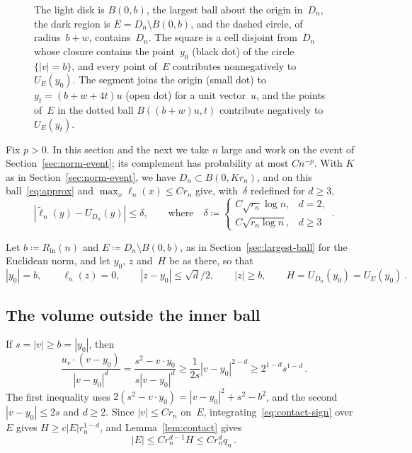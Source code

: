 \documentclass[11pt]{amsart}
\theoremstyle{plain}
\theoremstyle{definition}
\newcommand{\Rin}{R_{\mathrm{in}}}
\numberwithin{equation}{section}
\begin{document}
\begin{figure}[b]
\caption{The light disk is $B(0,b)$, the largest ball about the origin in~$D_n$, the dark region is $E=D_n\setminus B(0,b)$, and the dashed circle, of radius~$b+w$, contains~$D_n$. The square is a cell disjoint from~$D_n$ whose closure contains the point~$y_0$ (black dot) of the circle $\{|v|=b\}$, and every point of~$E$ contributes nonnegatively to~$U_E(y_0)$. The segment joins the origin (small dot) to $y_t=(b+w+4t)u$ (open dot) for a unit vector~$u$, and the points of~$E$ in the dotted ball $B((b+w)u,t)$ contribute negatively to~$U_E(y_t)$.}
\label{fig:contact}
\end{figure}

Fix $p>0$. In this section and the next we take $n$ large and work on the event of Section~\ref{sec:norm-event}; its complement has probability at most $Cn^{-p}$. With $K$ as in Section~\ref{sec:norm-event}, we have $D_n\subset B(0,Kr_n)$, and on this ball~\eqref{eq:approx} and $\max_x\ell_n(x)\leq Cr_n$ give, with~$\delta$ redefined for $d\geq3$,
\begin{equation}\label{eq:global}
|\widetilde\ell_n(y)-U_{D_n}(y)|\leq\delta,\qquad\text{where}\quad
\delta\coloneqq\begin{cases}C\sqrt{r_n}\log n,&d=2,\\C\sqrt{r_n\log n},&d\geq3\end{cases}\, .
\end{equation}

Let $b\coloneqq\Rin(n)$ and $E\coloneqq D_n\setminus B(0,b)$, as in Section~\ref{sec:largest-ball} for the Euclidean norm, and let $y_0$, $z$ and~$H$ be as there, so that
\begin{equation*}
|y_0|=b,\qquad\ell_n(z)=0,\qquad|z-y_0|\leq\sqrt d/2,\qquad|z|\geq b,\qquad H=U_{D_n}(y_0)=U_E(y_0)\, .
\end{equation*}

\subsection{The volume outside the inner ball}

If $s=|v|\geq b=|y_0|$, then
\begin{equation}\label{eq:contact-sign}
\frac{u_v\cdot(v-y_0)}{|v-y_0|^d}
=\frac{s^2-v\cdot y_0}{s|v-y_0|^d}
\geq\frac1{2s}|v-y_0|^{2-d}
\geq2^{1-d}s^{1-d}\, .
\end{equation}
The first inequality uses $2(s^2-v\cdot y_0)=|v-y_0|^2+s^2-b^2$, and the second $|v-y_0|\leq2s$ and $d\geq2$. Since $|v|\leq Cr_n$ on~$E$, integrating~\eqref{eq:contact-sign} over~$E$ gives $H\geq c|E|r_n^{1-d}$, and Lemma~\ref{lem:contact} gives
\begin{equation}\label{eq:mass}
|E|\leq Cr_n^{d-1}H\leq Cr_n^dq_n\, .
\end{equation}
\end{document}
